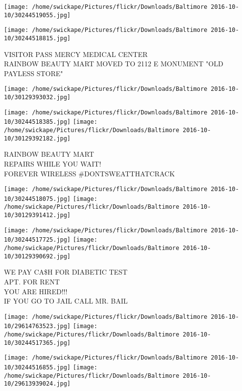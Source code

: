 \documentclass[10pt,letterpaper]{article}
\begin{document}
\texttt{[image: /home/swickape/Pictures/flickr/Downloads/Baltimore 2016-10-10/30244519055.jpg]}

\vspace{0.25in}
\texttt{[image: /home/swickape/Pictures/flickr/Downloads/Baltimore 2016-10-10/30244518815.jpg]}

VISITOR PASS MERCY MEDICAL CENTER\\
RAINBOW BEAUTY MART MOVED TO 2112 E MONUMENT "OLD PAYLESS STORE"\\
\pagebreak

\texttt{[image: /home/swickape/Pictures/flickr/Downloads/Baltimore 2016-10-10/30129393032.jpg]}

\vspace{0.25in}
\texttt{[image: /home/swickape/Pictures/flickr/Downloads/Baltimore 2016-10-10/30244518385.jpg]}
\texttt{[image: /home/swickape/Pictures/flickr/Downloads/Baltimore 2016-10-10/30129392182.jpg]}

RAINBOW BEAUTY MART\\
REPAIRS WHILE YOU WAIT!\\
FOREVER WIRELESS \#DONTSWEATTHATCRACK\\
\pagebreak

\texttt{[image: /home/swickape/Pictures/flickr/Downloads/Baltimore 2016-10-10/30244518075.jpg]}
\texttt{[image: /home/swickape/Pictures/flickr/Downloads/Baltimore 2016-10-10/30129391412.jpg]}

\texttt{[image: /home/swickape/Pictures/flickr/Downloads/Baltimore 2016-10-10/30244517725.jpg]}
\texttt{[image: /home/swickape/Pictures/flickr/Downloads/Baltimore 2016-10-10/30129390692.jpg]}

WE PAY CA\$H FOR DIABETIC TEST\\
APT. FOR RENT\\
YOU ARE HIRED!!!\\
IF YOU GO TO JAIL CALL MR. BAIL\\
\pagebreak

\texttt{[image: /home/swickape/Pictures/flickr/Downloads/Baltimore 2016-10-10/29614763523.jpg]}
\texttt{[image: /home/swickape/Pictures/flickr/Downloads/Baltimore 2016-10-10/30244517365.jpg]}

\texttt{[image: /home/swickape/Pictures/flickr/Downloads/Baltimore 2016-10-10/30244516855.jpg]}
\texttt{[image: /home/swickape/Pictures/flickr/Downloads/Baltimore 2016-10-10/29613939024.jpg]}
\end{document}
